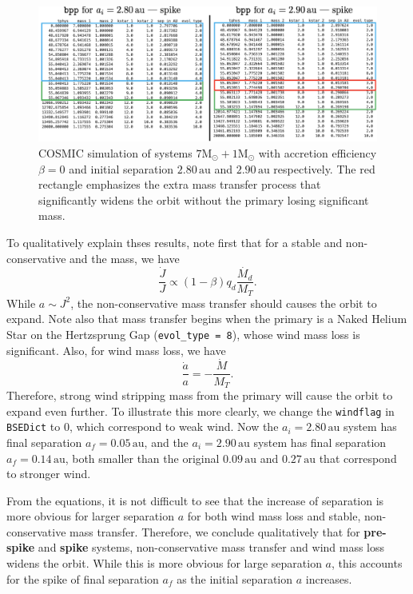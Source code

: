 \documentclass[12pt]{article}
\newcommand{\Msun}{\mathrm{M_{\odot}}}
\newcommand{\au}{\, \mathrm{au}}
\begin{document}
\begin{figure}
    \centering
    \includegraphics[width=\linewidth]{sharp-inc-bpp.png}
    \caption{COSMIC simulation of systems $7 \Msun + 1 \Msun$ with accretion efficiency $\beta = 0$ and initial separation $2.80 \au$ and $2.90 \au$ respectively. The red rectangle emphasizes the extra mass transfer process that significantly widens the orbit without the primary losing significant mass.}
    \label{spike}
\end{figure}

To qualitatively explain thses results, note first that for a stable and non-conservative and the mass, we have
\[
\frac{\dot J}{J} \propto (1-\beta) q_d \frac{\dot{M_d}}{M_T}.
\]
While $a \sim J^2$, the non-conservative mass transfer should causes the orbit to expand. Note also that mass transfer begins when the primary is a Naked Helium Star on the Hertzsprung Gap (\verb|evol_type = 8|), whose wind mass loss is significant. Also, for wind mass loss, we have
\[
\frac{\dot a}{a} = - \frac{\dot M}{M_T}.
\] 
Therefore, strong wind stripping mass from the primary will cause the orbit to expand even further. To illustrate this more clearly, we change the \verb|windflag| in \verb|BSEDict| to 0, which correspond to weak wind. Now the $a_i = 2.80 \au$ system has final separation $a_f = 0.05 \au$, and the $a_i = 2.90 \au$ system has final separation $a_f = 0.14 \au$, both smaller than the original $0.09 \au$ and $0.27\au$ that correspond to stronger wind.

From the equations, it is not difficult to see that the increase of separation is more obvious for larger separation $a$ for both wind mass loss and stable, non-conservative mass transfer. Therefore, we conclude qualitatively that for \textbf{pre-spike} and \textbf{spike} systems, non-conservative mass transfer and wind mass loss widens the orbit. While this is more obvious for large separation $a$, this accounts for the spike of final separation $a_f$ as the initial separation $a$ increases.
\end{document}
